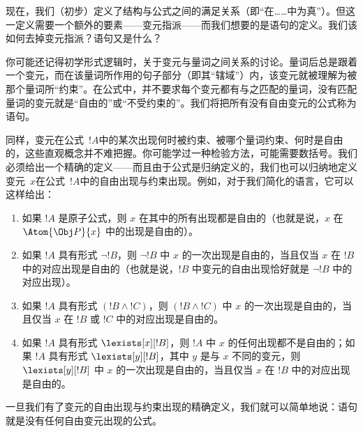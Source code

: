 \documentclass[../../../include/open-logic-section]{subfiles}
\begin{document}


现在，我们（初步）定义了结构与公式之间的满足关系（即“在……中为真”）。但这一定义需要一个额外的要素——变元指派——而我们想要的是语句的定义。我们该如何去掉变元指派？语句又是什么？

你可能还记得初学形式逻辑时，关于变元与量词之间关系的讨论。量词后总是跟着一个变元，而在该量词所作用的句子部分（即其“辖域”）内，该变元就被理解为被那个量词所“约束”。在公式中，并不要求每个变元都有与之匹配的量词，没有匹配量词的变元就是“自由的”或“不受约束的”。我们将把所有没有自由变元的公式称为语句。

同样，变元在公式~$!A$中的某次出现何时被约束、被哪个量词约束、何时是自由的，这些直观概念并不难把握。你可能学过一种检验方法，可能需要数括号。我们必须给出一个精确的定义——而且由于公式是归纳定义的，我们也可以归纳地定义变元~$x$在公式~$!A$中的自由出现与约束出现。例如，对于我们简化的语言，它可以这样给出：

\begin{enumerate}
  \item 如果 $!A$ 是原子公式，则 $x$ 在其中的所有出现都是自由的（也就是说，$x$ 在~$\Atom{\Obj P}{x}$ 中的出现是自由的）。
  \item 如果 $!A$ 具有形式 $\lnot !B$，则 $\lnot !B$ 中 $x$ 的一次出现是自由的，当且仅当 $x$ 在 $!B$ 中的对应出现是自由的（也就是说，$!B$ 中变元的自由出现恰好就是 $\lnot !B$ 中的对应出现）。
  \item 如果 $!A$ 具有形式 $(!B \land !C)$，则 $(!B \land !C)$ 中 $x$ 的一次出现是自由的，当且仅当 $x$ 在 $!B$ 或 $!C$ 中的对应出现是自由的。
  \item 如果 $!A$ 具有形式 $\lexists[x][!B]$，则 $!A$ 中 $x$ 的任何出现都不是自由的；如果 $!A$ 具有形式 $\lexists[y][!B]$，其中 $y$ 是与 $x$ 不同的变元，则 $\lexists[y][!B]$ 中 $x$ 的一次出现是自由的，当且仅当 $x$ 在 $!B$ 中的对应出现是自由的。
\end{enumerate}

一旦我们有了变元的自由出现与约束出现的精确定义，我们就可以简单地说：语句就是没有任何自由变元出现的公式。
\end{document}
